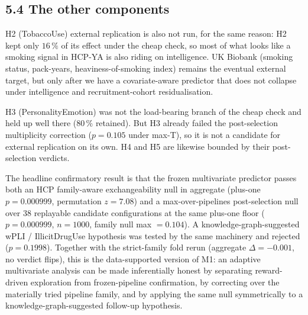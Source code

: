 \documentclass[11pt,letterpaper]{report}
\begin{document}
\subsection*{5.4 The other components}

H2 (TobaccoUse) external replication is also not run, for the same reason: H2 kept only $16\,\%$ of its effect under the cheap check, so most of what looks like a smoking signal in HCP-YA is also riding on intelligence. UK Biobank (smoking status, pack-years, heaviness-of-smoking index) remains the eventual external target, but only after we have a covariate-aware predictor that does not collapse under intelligence and recruitment-cohort residualisation.

H3 (PersonalityEmotion) was not the load-bearing branch of the cheap check and held up well there ($80\,\%$ retained). But H3 already failed the post-selection multiplicity correction ($p = 0.105$ under max-T), so it is not a candidate for external replication on its own. H4 and H5 are likewise bounded by their post-selection verdicts.



The headline confirmatory result is that the frozen multivariate predictor passes both an HCP family-aware exchangeability null in aggregate (plus-one $p = 0.000999$, permutation $z = 7.08$) and a max-over-pipelines post-selection null over 38 replayable candidate configurations at the same plus-one floor ($p = 0.000999$, $n = 1000$, family null max $= 0.104$). A knowledge-graph-suggested wPLI / IllicitDrugUse hypothesis was tested by the same machinery and rejected ($p = 0.1998$). Together with the strict-family fold rerun (aggregate $\Delta = -0.001$, no verdict flips), this is the data-supported version of M1: an adaptive multivariate analysis can be made inferentially honest by separating reward-driven exploration from frozen-pipeline confirmation, by correcting over the materially tried pipeline family, and by applying the same null symmetrically to a knowledge-graph-suggested follow-up hypothesis.
\end{document}
